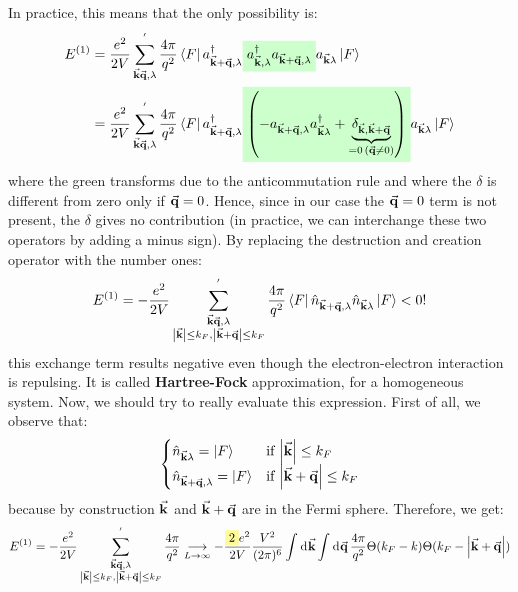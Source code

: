 \documentclass[../main/main.tex]{subfiles}
\begin{document}
In practice, this means that the only possibility is:
\begin{equation*}
\begin{split}
  E^{(1)} &= \frac{e^2}{2V} \sum_{\va{k}\va{q}, \lambda }^{'}
  \frac{4 \pi }{q^2}
  \bra{F} a_{\va{k} + \va{q}, \lambda }^\dag \mathcolorbox{green!20}{a_{\va{k}, \lambda  } ^\dag a_{\va{k}+\va{q}, \lambda  }} a_{\va{k} \lambda } \ket{F}
   \\
   & =
   \frac{e^2}{2V} \sum_{\va{k}\va{q}, \lambda }^{'}
   \frac{4 \pi }{q^2}
   \bra{F} a_{\va{k} + \va{q}, \lambda }^\dag   \mathcolorbox{green!20}{\qty(- a_{\va{k}+\va{q}, \lambda } a_{\va{k}\lambda }^\dag  + \underbrace{\delta _{\va{k},\va{k}+\va{q}}}_{=0 \, (\va{q}\neq0)} )} a_{\va{k} \lambda } \ket{F}
\end{split}
\end{equation*}
where the green transforms due to the anticommutation rule and where the \( \delta  \) is different from zero only if \( \va{q}=0 \).  Hence, since in our case the \( \va{q}=0  \) term is not present, the \( \delta  \) gives no contribution (in practice, we can interchange these two operators by adding a minus sign).
By replacing the destruction and creation operator with the number ones:
\begin{equation*}
  E^{(1)} = -\frac{e^2}{2V} \sum_{\substack{\va{k}\va{q}, \lambda  \\ \abs{\va{k}} \le k_F, \abs{\va{k}+\va{q}}\le k_F   } }^{'}
\frac{4 \pi }{q^2} \bra{F} \hat{n}_{\va{k}+\va{q},\lambda } \hat{n}_{\va{k}\lambda } \ket{F}  <0!
\end{equation*}
this exchange term results negative even though the electron-electron interaction is repulsing. It is called \textbf{Hartree-Fock} approximation, for a homogeneous system. 
Now, we should try to really evaluate this expression. First of all, we observe that:
\begin{equation*}
  \begin{cases}
  \hat{n}_{\va{k} \lambda } =\ket{F} & \text{if } \abs{\va{k}}\le k_F   \\
  \hat{n}_{\va{k}+\va{q}, \lambda } =\ket{F} & \text{if } \abs{\va{k}+\va{q}}\le k_F
  \end{cases}
\end{equation*}
because by construction \( \va{k} \) and \( \va{k} + \va{q} \) are in the Fermi sphere.
Therefore, we get:
\begin{equation*}
  E^{(1)} = -\frac{e^2}{2V} \sum_{\substack{\va{k}\va{q}, \lambda  \\ \abs{\va{k}} \le k_F, \abs{\va{k}+\va{q}}\le k_F   } }^{'} \frac{4 \pi }{q^2}
  \underset{L \rightarrow \infty }{\longrightarrow }
  - \frac{\mathcolorbox{yellow!40}{2}e^2}{2V} \frac{V^2}{(2 \pi )^6}
  \int_{}^{} \dd[]{\va{k}}
  \int_{}^{} \dd[]{\va{q}} \frac{4 \pi }{q^2} \Theta (k_F- k) \Theta (k_F - \abs{\va{k}+\va{q}} )
\end{equation*}
\end{document}
